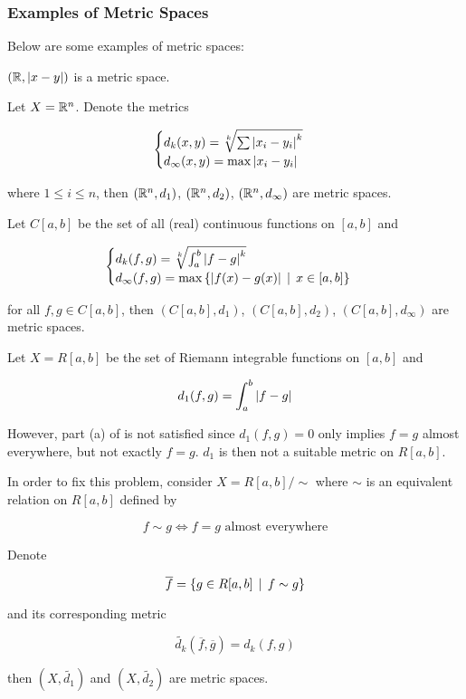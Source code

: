 \documentclass[a4paper,12pt]{article}
\begin{document}
\subsubsection{Examples of Metric Spaces}
\begin{exm}
  Below are some examples of metric spaces:

  \begin{alist}
    \item $(\mathbb{R},\left| x-y\right|)$ is a metric space.
    \item Let $X=\mathbb{R}^{n}$. Denote the metrics
    
    $$\begin{cases}
      d_{k}(x,y)=\sqrt[k]{\sum\left| x_{i}-y_{i}\right|^{k}}\\
      d_{\infty}(x,y)=\max\left| x_{i}-y_{i}\right|
    \end{cases}$$\s

    where $1\leq i\leq n$, then $(\mathbb{R}^{n},d_{1})$, $(\mathbb{R}^{n},d_{2})$, $(\mathbb{R}^{n},d_{\infty})$ are metric spaces.
    \item Let $C[a,b]$ be the set of all (real) continuous functions on $[a,b]$ and
    
    $$\begin{cases}
      d_{k}(f,g)=\sqrt[k]{\int_{a}^{b}\left| f-g\right|^{k}}\\
      d_{\infty}(f,g)=\max\left\{ \left| f(x)-g(x)\right|\,\mid\, x\in[a,b]\right\}
    \end{cases}$$\s

    for all $f,g\in C[a,b]$, then $(C[a,b], d_{1})$, $(C[a,b], d_{2})$, $(C[a,b], d_{\infty})$ are metric spaces.
  \end{alist}
\end{exm}\n

\begin{exm}
  Let $X=R[a,b]$ be the set of Riemann integrable functions on $[a,b]$ and

  $$d_{1}(f,g)=\int_{a}^{b}\left| f-g\right|$$\s

  However, part (a) of \rdft[\sctd{3}] is not satisfied since $d_{1}(f,g)=0$ only implies $f=g$ almost everywhere, but not exactly $f=g$. $d_{1}$ is then not a suitable metric on $R[a,b]$.\n

  In order to fix this problem, consider $X=R[a,b]/\sim$ where $\sim$ is an equivalent relation on $R[a,b]$ defined by

  $$f\sim g\Leftrightarrow f=g\text{ almost everywhere}$$\s

  Denote
  
  $$\overline{f}=\left\{ g\in R[a,b]\,\mid\, f\sim g\right\}$$\s

  and its corresponding metric

  $$\tilde{d_{k}}(\overline{f},\overline{g})=d_{k}(f,g)$$\s

  then $(X,\tilde{d_{1}})$ and $(X,\tilde{d_{2}})$ are metric spaces.
\end{exm}\n
\end{document}
